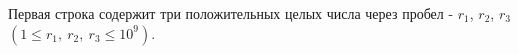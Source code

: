 Первая строка содержит три положительных целых числа через пробел - $r_1$, $r_2$, $r_3$ $(1 \leq r_1,~r_2,~r_3 \leq 10^9)$.
